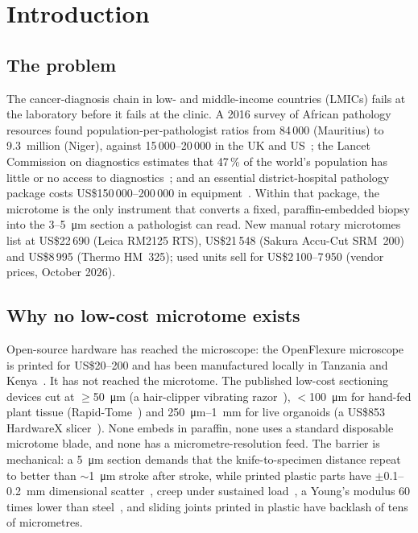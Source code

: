 \documentclass[11pt,a4paper]{article}
\begin{document}
\begin{abstract}
US\$61.97, a $>99\,\%$ reduction relative to new list price. These are model predictions: the machine has not yet been built or measured. The design, analysis code and a validation protocol are released so that the predictions can be tested on a physical build.
\end{abstract}

\section{Introduction}
\subsection{The problem}
The cancer-diagnosis chain in low- and middle-income countries (LMICs) fails at the laboratory before it fails at the clinic. A 2016 survey of African pathology resources found population-per-pathologist ratios from 84\,000 (Mauritius) to 9.3~million (Niger), against 15\,000--20\,000 in the UK and US~\citep{Nelson2016}; the Lancet Commission on diagnostics estimates that 47\,\% of the world's population has little or no access to diagnostics~\citep{Fleming2021}; and an essential district-hospital pathology package costs US\$150\,000--200\,000 in equipment~\citep{Fleming2016}. Within that package, the microtome is the only instrument that converts a fixed, paraffin-embedded biopsy into the 3--\SI{5}{\micro\metre} section a pathologist can read. New manual rotary microtomes list at US\$22\,690 (Leica RM2125 RTS), US\$21\,548 (Sakura Accu-Cut SRM~200) and US\$8\,995 (Thermo HM~325); used units sell for US\$2\,100--7\,950 (vendor prices, October 2026).

\subsection{Why no low-cost microtome exists}
Open-source hardware has reached the microscope: the OpenFlexure microscope is printed for US\$20--200 and has been manufactured locally in Tanzania and Kenya~\citep{Collins2020}. It has not reached the microtome. The published low-cost sectioning devices cut at $\geq$\SI{50}{\micro\metre} (a hair-clipper vibrating razor~\citep{Bazer1980}), $<$\SI{100}{\micro\metre} for hand-fed plant tissue (Rapid-Tome~\citep{Thomas2023}) and \SI{250}{\micro\metre}--\SI{1}{\milli\metre} for live organoids (a US\$853 HardwareX slicer~\citep{MartinezMartin2024}). None embeds in paraffin, none uses a standard disposable microtome blade, and none has a micrometre-resolution feed. The barrier is mechanical: a \SI{5}{\micro\metre} section demands that the knife-to-specimen distance repeat to better than $\sim$\SI{1}{\micro\metre} stroke after stroke, while printed plastic parts have $\pm$0.1--\SI{0.2}{\milli\metre} dimensional scatter~\citep{Melenka2015}, creep under sustained load~\citep{Waseem2020}, a Young's modulus 60 times lower than steel~\citep{Tymrak2014}, and sliding joints printed in plastic have backlash of tens of micrometres.
\end{document}
